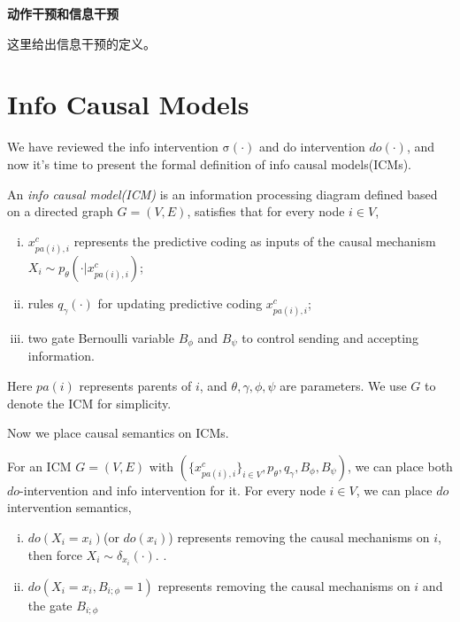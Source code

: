\documentclass[letterpaper, onecolumn]{article}
\newcommand{\info}{\mathrm{\sigma}}
\begin{document}
\begin{CJK*}{UTF8}{gbsn}
\textbf{动作干预和信息干预}

这里给出信息干预的定义。



\section{Info Causal Models}

We have reviewed the info intervention $\info(\cdot)$ and do intervention $do(\cdot)$, and now it's time to present the formal definition of info causal models(ICMs).



 \begin{Def}
 	An \emph{info causal model(ICM)} is an information processing diagram defined based on a directed graph $G=(V, E)$, satisfies that
 	for every node $i\in V$, 
	\begin{enumerate}[(i)]
		\setlength\itemsep{0em}
		\item $x_{pa(i), i}^c$ represents the predictive coding as inputs of the causal mechanism $X_i \sim p_\theta(\cdot|x^c_{pa(i), i})$;
		\item rules $q_\gamma(\cdot)$ for updating predictive coding $x^c_{pa(i), i}$;
		\item two gate Bernoulli variable $B_\phi$ and $B_\psi$ to control sending and accepting information.
	\end{enumerate}
	Here $pa(i)$ represents parents of $i$, and $\theta, \gamma, \phi, \psi$ are parameters. We use $G$ to denote the ICM for simplicity.
\end{Def}

Now we place causal semantics on ICMs.

\begin{Def}
	For an ICM $G=(V, E)$ with $(\{x^c_{pa(i), i}\}_{i \in V}, p_\theta, q_\gamma, B_\phi, B_\psi)$, we can place both $do$-intervention and info intervention for it. For every node $i \in V$, we can place $do$ intervention semantics,
	
	\begin{enumerate}[(i)]
	\setlength\itemsep{0em}
	\item $do(X_i=x_i)$(or $do(x_i)$) represents removing the causal mechanisms on $i$, then force $X_i \sim \delta_{x_i}(\cdot)$. .
	\item $do(X_i=x_i, B_{i;\phi} = 1)$ represents removing the causal mechanisms on $i$ and the gate $B_{i;\phi}$
	\end{enumerate}


\end{Def}
\end{CJK*}
\end{document}
